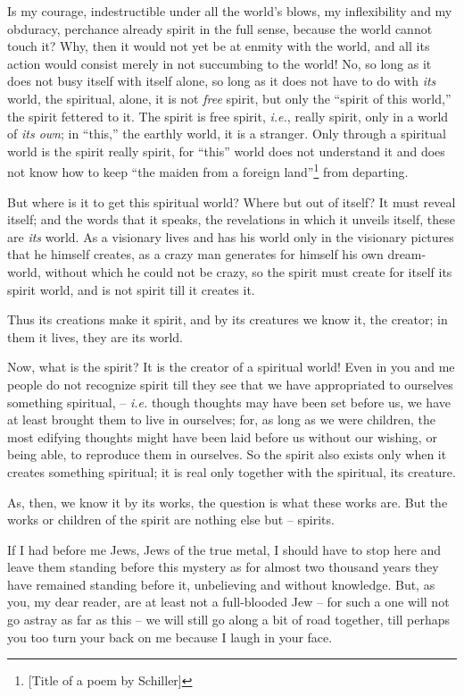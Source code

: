 \documentclass[12pt,a4paper]{book}
\begin{document}
Is my courage, indestructible under all the world's blows, my inflexibility 
and my obduracy, perchance already spirit in the full sense, because the world 
cannot touch it? Why, then it would not yet be at enmity with the world, and 
all its action would consist merely in not succumbing to the world! No, so 
long as it does not busy itself with itself alone, so long as it does not have 
to do with \textit{its} world, the spiritual, alone, it is not \textit{free} 
spirit, but only the ``spirit of this world,'' the spirit fettered to it. 
The spirit is free spirit, \textit{i.e.}, really spirit, only in a world of 
\textit{its own}; in ``this,'' the earthly world, it is a stranger. Only 
through a spiritual world is the spirit really spirit, for ``this'' world 
does not understand it and does not know how to keep ``the maiden from a 
foreign land''\footnote{[Title of a poem by Schiller]} from departing.

But where is it to get this spiritual world? Where but out of itself? It must 
reveal itself; and the words that it speaks, the revelations in which it 
unveils itself, these are \textit{its} world. As a visionary lives and has his 
world only in the visionary pictures that he himself creates, as a crazy man 
generates for himself his own dream-world, without which he could not be 
crazy, so the spirit must create for itself its spirit world, and is not 
spirit till it creates it.

Thus its creations make it spirit, and by its creatures we know it, the 
creator; in them it lives, they are its world.

Now, what is the spirit? It is the creator of a spiritual world! Even in you 
and me people do not recognize spirit till they see that we have appropriated 
to ourselves something spiritual, -- \textit{i.e.} though thoughts may have 
been set before us, we have at least brought them to live in ourselves; for, 
as long as we were children, the most edifying thoughts might have been laid 
before us without our wishing, or being able, to reproduce them in ourselves. 
So the spirit also exists only when it creates something spiritual; it is real 
only together with the spiritual, its creature.

As, then, we know it by its works, the question is what these works are. But 
the works or children of the spirit are nothing else but -- spirits.

If I had before me Jews, Jews of the true metal, I should have to stop here 
and leave them standing before this mystery as for almost two thousand years 
they have remained standing before it, unbelieving and without knowledge. But, 
as you, my dear reader, are at least not a full-blooded Jew -- for such a one 
will not go astray as far as this -- we will still go along a bit of road 
together, till perhaps you too turn your back on me because I laugh in your 
face.
\end{document}
